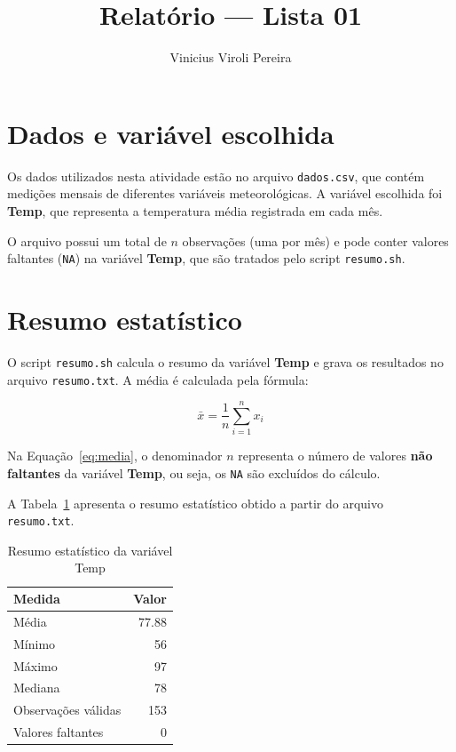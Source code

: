 \documentclass{article}
\title{Relatório — Lista 01}
\author{Vinicius Viroli Pereira}
\date{}
\begin{document}
\maketitle

\section{Dados e variável escolhida}

Os dados utilizados nesta atividade estão no arquivo \texttt{dados.csv}, que contém
medições mensais de diferentes variáveis meteorológicas. A variável escolhida foi
\textbf{Temp}, que representa a temperatura média registrada em cada mês.

O arquivo possui um total de $n$ observações (uma por mês) e pode conter valores
faltantes (\texttt{NA}) na variável \textbf{Temp}, que são tratados pelo script
\texttt{resumo.sh}.

\section{Resumo estatístico}

O script \texttt{resumo.sh} calcula o resumo da variável \textbf{Temp} e grava os
resultados no arquivo \texttt{resumo.txt}. A média é calculada pela fórmula:

\begin{equation}
\label{eq:media}
\bar{x} = \frac{1}{n} \sum_{i=1}^{n} x_i
\end{equation}

Na Equação~\eqref{eq:media}, o denominador $n$ representa o número de valores
\textbf{não faltantes} da variável \textbf{Temp}, ou seja, os \texttt{NA} são
excluídos do cálculo.

A Tabela~\ref{tab:resumo} apresenta o resumo estatístico obtido a partir do
arquivo \texttt{resumo.txt}.

\begin{table}[H]
  \centering
  \caption{Resumo estatístico da variável Temp}
  \label{tab:resumo}
  \begin{tabular}{lr}
    \toprule
    Medida & Valor \\
    \midrule
    Média & 77.88 \\
    Mínimo & 56 \\
    Máximo & 97 \\
    Mediana & 78 \\
    Observações válidas & 153 \\
    Valores faltantes & 0 \\
    \bottomrule
  \end{tabular}
\end{table}
\end{document}
